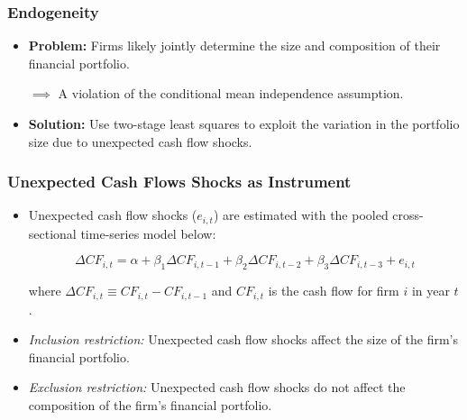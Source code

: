 \documentclass[handout]{beamer}
\begin{document}
\begin{frame}[label=endogeneity]
\frametitle{Endogeneity}

\begin{itemize}[<+->]
\item \textbf{Problem:} Firms likely jointly determine the size and composition of their financial portfolio.

\bigskip

$\implies$ A violation of the conditional mean independence assumption.

\bigskip

\item \textbf{Solution:} Use two-stage least squares to exploit the variation in the portfolio size due to unexpected cash flow shocks.
\end{itemize}

\end{frame}


\begin{frame}
\frametitle{Unexpected Cash Flows Shocks as Instrument}

\begin{itemize}[<+->]

\item Unexpected cash flow shocks ($e_{i,t}$) are estimated with the pooled cross-sectional time-series model below:

$$
\Delta CF_{i,t}
= \alpha + \beta_1 \Delta CF_{i,t-1} + \beta_2 \Delta CF_{i,t-2} + \beta_3 \Delta CF_{i,t-3} + e_{i,t}
$$

where $\Delta CF_{i,t} \equiv CF_{i,t} - CF_{i,t-1}$ and $CF_{i,t}$ is the cash flow for firm $i$ in year $t$.

\bigskip

\item \textit{Inclusion restriction:} Unexpected cash flow shocks affect the size of the firm's financial portfolio.

\bigskip

\item \textit{Exclusion restriction:} Unexpected cash flow shocks do not affect the composition of the firm's financial portfolio.

\end{itemize}
\end{frame}
\end{document}
